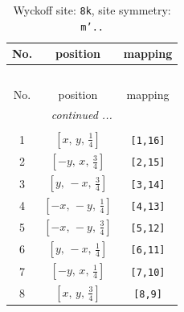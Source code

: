 \documentclass[fleqn,8pt]{jsarticle}
\begin{document}
\begin{longtable}{ccc}
\caption{Wyckoff site: {\tt 8k}, site symmetry: {\tt m'..}}
 \\
 \hline \hline
No. & position & mapping \\ \hline \endfirsthead

\multicolumn{2}{l}{\tablename\ \thetable{}} \\
 \hline \hline
No. & position & mapping \\ \hline \endhead

 \hline \hline
\multicolumn{2}{r}{\footnotesize\it continued ...} \\ \endfoot

 \hline \hline
\multicolumn{2}{r}{} \\ \endlastfoot

1 & $\left[ x,\, y,\, \frac{1}{4} \right]$ & {\tt [1,16]} \\ \hline
2 & $\left[ - y,\, x,\, \frac{3}{4} \right]$ & {\tt [2,15]} \\ \hline
3 & $\left[ y,\, - x,\, \frac{3}{4} \right]$ & {\tt [3,14]} \\ \hline
4 & $\left[ - x,\, - y,\, \frac{1}{4} \right]$ & {\tt [4,13]} \\ \hline
5 & $\left[ - x,\, - y,\, \frac{3}{4} \right]$ & {\tt [5,12]} \\ \hline
6 & $\left[ y,\, - x,\, \frac{1}{4} \right]$ & {\tt [6,11]} \\ \hline
7 & $\left[ - y,\, x,\, \frac{1}{4} \right]$ & {\tt [7,10]} \\ \hline
8 & $\left[ x,\, y,\, \frac{3}{4} \right]$ & {\tt [8,9]} \\
\end{longtable}
\renewcommand{\arraystretch}{1.2}
\end{document}
